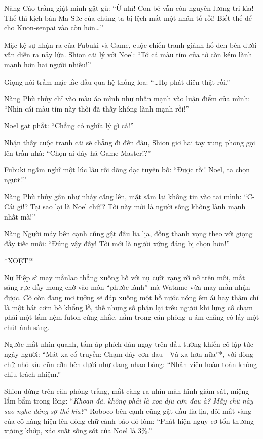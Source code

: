 \documentclass[../main.tex]{subfiles}
\begin{document}
Nàng Cáo trắng giật mình gật gù: ``Ừ nhỉ! Con bé vẫn còn nguyên lương tri kìa! Thế thì kịch bản Ma Sức của chúng ta bị lệch mất một nhân tố rồi! Biết thế để cho Kuon-senpai vào còn hơn\dots''

Mặc kệ sự nhận ra của Fubuki và Game, cuộc chiến tranh giành hố đen bên dưới vẫn diễn ra nảy lửa. Shion cãi lý với Noel: ``Tớ cá màu tím của tớ còn kém lành mạnh hơn hai người nhiều!''

Giọng nói trầm mặc lắc đầu qua hệ thống loa: ``\dots Họ phát điên thật rồi.''

Nàng Phù thủy chỉ vào màu áo mình như nhấn mạnh vào luận điểm của mình: ``Nhìn cái màu tím này thôi đã thấy không lành mạnh rồi!''

Noel gạt phắt: ``Chẳng có nghĩa lý gì cả!''

Nhận thấy cuộc tranh cãi sẽ chẳng đi đến đâu, Shion giơ hai tay xung phong gọi lên trần nhà: ``Chọn ai đây hả Game Master!?''

Fubuki ngẫm nghĩ một lúc lâu rồi dõng dạc tuyên bố: ``Được rồi! Noel, ta chọn ngươi!''

Nàng Phù thủy gần như nhảy cẫng lên, mặt sẫm lại không tin vào tai mình: ``C-Cái gì!? Tại sao lại là Noel chứ!? Tôi này mới là người sống không lành mạnh nhất mà!''

Nàng Người máy bên cạnh cũng gật đầu lia lịa, đồng thanh vọng theo với giọng đầy tiếc nuối: ``Đúng vậy đấy! Tôi mới là người xứng đáng bị chọn hơn!''

*XOẸT!*

Nữ Hiệp sĩ may mắnlao thẳng xuống hố với nụ cười rạng rỡ nở trên môi, mắt sáng rực đầy mong chờ vào món ``phước lành'' mà Watame vừa may mắn nhận được. Cô còn đang mơ tưởng sẽ đáp xuống một hồ nước nóng êm ái hay thậm chí là một bát cơm bò khổng lồ, thế nhưng số phận lại trêu ngươi khi lưng cô chạm phải một tấm nệm futon cứng nhắc, nằm trong căn phòng u ám chẳng có lấy một chút ánh sáng.

Ngước mắt nhìn quanh, tấm áp phích dán ngay trên đầu tường khiến cô lập tức ngây người: ``Mát-xa cổ truyền: Chạm đáy cơn đau - Và xa hơn nữa''*, với dòng chữ nhỏ xíu cũn cỡn bên dưới như đang nhạo báng: ``Nhân viên hoàn toàn không chịu trách nhiệm.''


Shion đứng trên căn phòng trắng, mắt căng ra nhìn màn hình giám sát, miệng lẩm bẩm trong lòng: ``\textit{Khoan đã, không phải là xoa dịu cơn đau à? Mấy chữ này sao nghe đáng sợ thế kia?}'' Roboco bên cạnh cũng gật đầu lia lịa, đôi mắt vàng của cô nàng hiện lên dòng chữ cảnh báo đỏ lòm: ``Phát hiện nguy cơ tổn thương xương khớp, xác suất sống sót của Noel là 3\%.''
\end{document}
